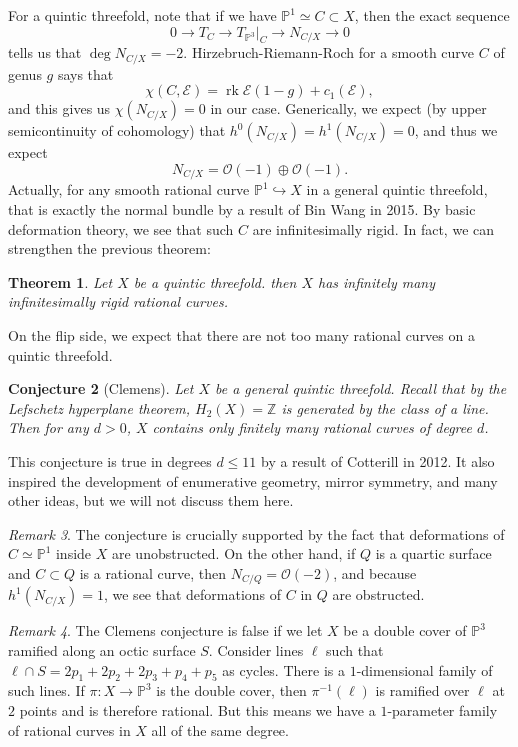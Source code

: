 \documentclass{amsart}
\newtheorem{thm}{Theorem}[section]
\newtheorem{conj}[thm]{Conjecture}
\theoremstyle{definition}
\theoremstyle{remark}
\newtheorem{rmk}[thm]{Remark}
\theoremstyle{plain}
\theoremstyle{definition}
\theoremstyle{remark}
\newcommand{\Z}{\mathbb{Z}}
\renewcommand{\P}{\mathbb{P}}
\newcommand{\mc}[1]{\mathcal{#1}}
\newcommand{\on}[1]{\operatorname{#1}}
\newcommand{\1}{\mathbf{1}}
\newcommand{\2}{\mathbf{2}}
\newcommand{\3}{\mathbf{3}}
\begin{document}
For a quintic threefold, note that if we have $\P^1 \simeq C \subset X$, then the exact sequence
\[ 0 \to T_{C} \to T_{\P^3}|_C \to N_{C/X} \to 0 \]
tells us that $\deg N_{C/X} = -2$. Hirzebruch-Riemann-Roch for a smooth curve $C$ of genus $g$ says that
\[ \chi(C, \mc{E}) = \on{rk} \mc{E} (1-g) + c_1(\mc{E}), \]
and this gives us $\chi(N_{C/X}) = 0$ in our case. Generically, we expect (by upper semicontinuity of cohomology) that $h^0(N_{C/X}) = h^1(N_{C/X}) = 0$, and thus we expect
\[ N_{C/X} = \mc{O}(-1) \oplus \mc{O}(-1). \]
Actually, for any smooth rational curve $\P^1 \hookrightarrow X$ in a general quintic threefold, that is exactly the normal bundle by a result of Bin Wang in 2015. By basic deformation theory, we see that such $C$ are infinitesimally rigid. In fact, we can strengthen the previous theorem:

\begin{thm}
    Let $X$ be a quintic threefold. then $X$ has infinitely many infinitesimally rigid rational curves.
\end{thm}

On the flip side, we expect that there are not too many rational curves on a quintic threefold.

\begin{conj}[Clemens]
    Let $X$ be a general quintic threefold. Recall that by the Lefschetz hyperplane theorem, $H_2(X) = \Z$ is generated by the class of a line. Then for any $d > 0$, $X$ contains only finitely many rational curves of degree $d$.
\end{conj}

This conjecture is true in degrees $d \leq 11$ by a result of Cotterill in 2012. It also inspired the development of enumerative geometry, mirror symmetry, and many other ideas, but we will not discuss them here.

\begin{rmk}
    The conjecture is crucially supported by the fact that deformations of $C \simeq \P^1$ inside $X$ are unobstructed. On the other hand, if $Q$ is a quartic surface and $C \subset Q$ is a rational curve, then $N_{C/Q} = \mc{O}(-2)$, and because $h^1(N_{C/X}) = 1$, we see that deformations of $C$ in $Q$ are obstructed.
\end{rmk}

\begin{rmk}
    The Clemens conjecture is false if we let $X$ be a double cover of $\P^3$ ramified along an octic surface $S$. Consider lines $\ell$ such that $\ell \cap S = 2p_1 + 2 p_2 + 2 p_3 + p_4 + p_5$ as cycles. There is a $1$-dimensional family of such lines. If $\pi \colon X \to \P^3$ is the double cover, then $\pi^{-1}(\ell)$ is ramified over $\ell$ at $2$ points and is therefore rational. But this means we have a $1$-parameter family of rational curves in $X$ all of the same degree.
\end{rmk}
\end{document}
